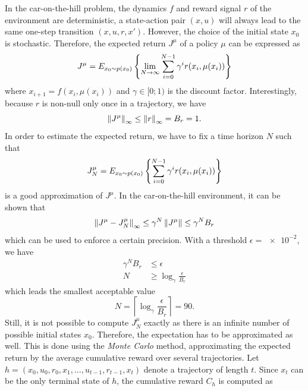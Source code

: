 \documentclass[a4paper, 12pt]{article}
\begin{document}
    In the car-on-the-hill problem, the dynamics $f$ and reward signal $r$ of the environment are deterministic, \ie{} a state-action pair $(x, u)$ will always lead to the same one-step transition $(x, u, r, x')$. However, the choice of the initial state $x_0$ is stochastic. Therefore, the expected return $J^\mu$ of a policy $\mu$ can be expressed as
    \begin{equation}
        J^\mu = E_{x_0 \sim p(x_0)} \left\{ \lim_{N \to \infty} \sum_{i = 0}^{N - 1} \gamma^i r(x_i, \mu(x_i)) \right\}
    \end{equation}
    where $x_{i + 1} = f(x_i, \mu(x_i))$ and $\gamma \in [0; 1)$ is the discount factor. Interestingly, because $r$ is non-null only once in a trajectory, we have
    \begin{equation}
        \left\|J^\mu\right\|_\infty \leq \left\|r\right\|_\infty = B_r = 1 .
    \end{equation}
    In order to estimate the expected return, we have to fix a time horizon $N$ such that
    \begin{equation}\label{eq:N-expected.return}
        J^\mu_N = E_{x_0 \sim p(x_0)} \left\{ \sum_{i = 0}^{N - 1} \gamma^i r(x_i, \mu(x_i)) \right\}
    \end{equation}
    is a good approximation of $J^\mu$. In the car-on-the-hill environment, it can be shown \cite{ernstinfo8003, rozet2021suboptimality} that
    \begin{equation}
        \left\|J^\mu - J^\mu_N\right\|_\infty \leq \gamma^N \left\|J^\mu\right\| \leq \gamma^N B_r
    \end{equation}
    which can be used to enforce a certain precision. With a threshold $\epsilon = \num{e-2}$, we have
    \begin{align*}
        \gamma^N B_r & \leq \epsilon \\
        N & \geq \log_\gamma \frac{\epsilon}{B_r}
    \end{align*}
    which leads the smallest acceptable value
    \begin{equation}\label{eq:N-smallest.acceptable}
        N = \left\lceil \log_\gamma \frac{\epsilon}{B_r} \right\rceil = 90.
    \end{equation}
    Still, it is not possible to compute $J^\mu_N$ exactly as there is an infinite number of possible initial states $x_0$. Therefore, the expectation has to be approximated as well. This is done using the \emph{Monte Carlo} method, \ie{} approximating the expected return by the average cumulative reward over several trajectories. Let $h = (x_0, u_0, r_0, x_1, \dots, u_{t - 1}, r_{t - 1}, x_t)$ denote a trajectory of length $t$. Since $x_t$ can be the only terminal state of $h$, the cumulative reward $C_h$ is computed as
\end{document}
